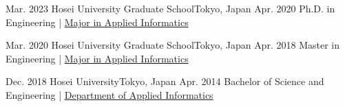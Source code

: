 
\begin{educations}
    \education
    {Mar. 2023} {Hosei University Graduate School}{Tokyo, Japan}{}
    {Apr. 2020} {Ph.D. in Engineering | \href{https://www.hosei.ac.jp/english/admissions/graduate/jbdp/science_engineering/applied_informatics/}{Major in Applied Informatics}}

    \emptySeparator
    \education
    {Mar. 2020} {Hosei University Graduate School}{Tokyo, Japan}{}
    {Apr. 2018} {Master in Engineering | \href{https://www.hosei.ac.jp/english/admissions/graduate/jbdp/science_engineering/applied_informatics/}{Major in Applied Informatics}}

    \emptySeparator
    \education
    {Dec. 2018} {Hosei University}{Tokyo, Japan}{}
    {Apr. 2014} {Bachelor of Science and Engineering | \href{https://www.hosei.ac.jp/english/admissions/undergraduate/jbdp/faculty/science/informatics}{Department of Applied Informatics}}
\end{educations}
